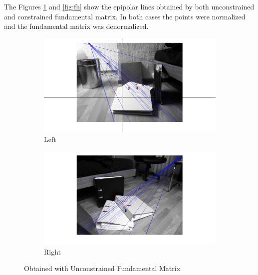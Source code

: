 \documentclass[paper=a4, fontsize=11pt]{scrartcl} %
\numberwithin{equation}{section} %
\numberwithin{figure}{section} %
\numberwithin{table}{section} %
\begin{document}
The Figures \ref{fig:f} and \ref{fig:fh} show the epipolar lines obtained by both unconstrained and constrained fundamental matrix. In both cases the points were normalized and the fundamental matrix was denormalized.
\begin{figure}
\centering
\begin{subfigure}{.5\textwidth}
  \centering
  \includegraphics[width=1.5\linewidth]{f1.jpg}
  \caption{Left}
\end{subfigure}%
\begin{subfigure}{.7\textwidth}
  \centering
  \includegraphics[width=1.1\linewidth]{f2.jpg}
  \caption{Right}
\end{subfigure}
\caption{Obtained with Unconstrained Fundamental Matrix}
\label{fig:f}
\end{figure}
\end{document}
